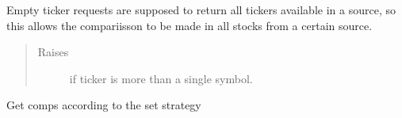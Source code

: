 \documentclass[letterpaper,10pt,english]{sphinxmanual}
\begin{document}
\begin{fulllineitems}
\begin{fulllineitems}
Empty ticker requests are supposed to return all tickers available in
a source, so this allows the compariisson to be made in all stocks
from a certain source.
\begin{quote}\begin{description}
\item[{Raises}] \leavevmode
{} \textendash{} if ticker is more than a single symbol.

\end{description}\end{quote}

\end{fulllineitems}


\begin{fulllineitems}
\label{\detokenize{dalio.pipe:dalio.pipe.StockComps.transform}}
Get comps according to the set strategy

\end{fulllineitems}


\end{fulllineitems}

\end{document}

